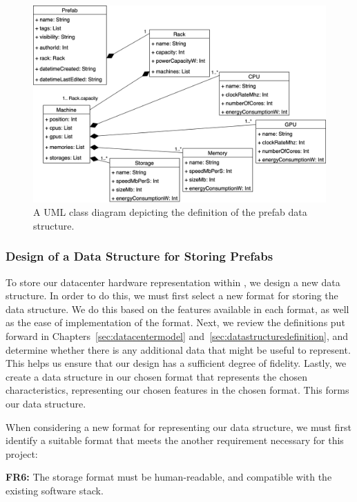 \documentclass[11pt]{article}
\begin{document}
		\begin{figure}[h]
			\centering
			\includegraphics[width=\textwidth]{design/classdiagram.png}
			\caption[UML Class Diagram of Prefab Definition]{A UML class diagram depicting the definition of the prefab data structure.}
			\label{fig:umlclassdiagram}
		\end{figure}

		\subsubsection{Design of a Data Structure for Storing Prefabs} \label{sec:datastructuredesign}
			To store our datacenter hardware representation within \opendc{}, we design a new data structure.
			In order to do this, we must first select a new format for storing the data structure.
			We do this based on the features available in each format, as well as the ease of implementation of the format.
			Next, we review the definitions put forward in Chapters~\ref{sec:datacentermodel} and~\ref{sec:datastructuredefinition}, and determine whether there is any additional data that might be useful to represent.
			This helps us ensure that our design has a sufficient degree of fidelity.
			Lastly, we create a data structure in our chosen format that represents the chosen characteristics, representing our chosen features in the chosen format.
			This forms our data structure. 
			
			When considering a new format for representing our data structure, we must first identify a suitable format that meets the another requirement necessary for this project:

			\textbf{FR6:} The storage format must be human-readable, and compatible with the existing \opendc{} software stack.
\end{document}
